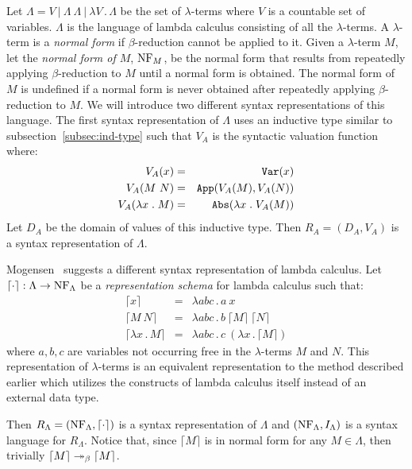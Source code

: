 \documentclass[11pt,fleqn]{article}
\newcommand{\bsynbrack}[1]{\lceil#1\rceil}
\newcommand{\mdot}{\mathrel.}
\newcommand{\tarrow}{\rightarrow}
\begin{document}
Let $\Lambda = V ~|~ \Lambda ~ \Lambda ~|~ \lambda V \mdot \Lambda$ be
the set of $\lambda$-terms where $V$ is a countable set of
variables. $\Lambda$ is the language of lambda calculus consisting of
all the $\lambda$-terms.  A $\lambda$-term is a \emph{normal form} if
$\beta$-reduction cannot be applied to it.  Given a $\lambda$-term
$M$, let the \emph{normal form of $M$}, ${\rm NF}_M$, be the normal
form that results from repeatedly applying $\beta$-reduction to $M$
until a normal form is obtained.  The normal form of $M$ is undefined
if a normal form is never obtained after repeatedly applying
$\beta$-reduction to $M$.  We will introduce two different syntax
representations of this language. The first syntax representation of
$\Lambda$ uses an inductive type similar to
subsection~\ref{subsec:ind-type} such that $V_A$ is the syntactic
valuation function where: \setcounter{equation}{0}
\begin{eqnarray}
V_A(x) & = & {\tt Var}(x)\\
V_A(M~N) & = & {\tt App}(V_A(M), V_A(N))\\
V_A(\lambda x \mdot M) & = & {\tt Abs}(\lambda x \mdot V_A(M))
\end{eqnarray}
\noindent 
Let $D_A$ be the domain of values of this inductive type.
Then $R_A = (D_A,V_A)$ is a syntax representation of $\Lambda$.

Mogensen~\cite{Mogensen94} suggests a different syntax representation
of lambda calculus. Let $\bsynbrack{\cdot} : \Lambda \tarrow
\nflambda$ be a {\em representation schema} for lambda calculus such
that: 
\setcounter{equation}{0}
\begin{eqnarray}
\bsynbrack{x} & = & \lambda a b c \mdot a ~ x\\
\bsynbrack{M~N} & = & \lambda a b c \mdot b ~ \bsynbrack{M} ~ \bsynbrack{N}\\
\bsynbrack{\lambda x \mdot M} & = & \lambda a b c \mdot c ~ (\lambda x \mdot \bsynbrack{M})
\end{eqnarray}
\noindent 
where $a,b,c$ are variables not occurring free in the $\lambda$-terms
$M$ and $N$. This representation of $\lambda$-terms is an equivalent
representation to the method described earlier which utilizes the
constructs of lambda calculus itself instead of an external data type.

Then $R_{\Lambda} = (\nflambda, \bsynbrack{\cdot})$ is a syntax
representation of $\Lambda$ and $({\rm NF}_{\Lambda}, I_{\Lambda})$ is a
syntax language for $R_{\Lambda}$. Notice that, since $\bsynbrack{M}$
is in normal form for any $M \in \Lambda$, then trivially
$\bsynbrack{M} \betaarrow \bsynbrack{M}$.
\end{document}
